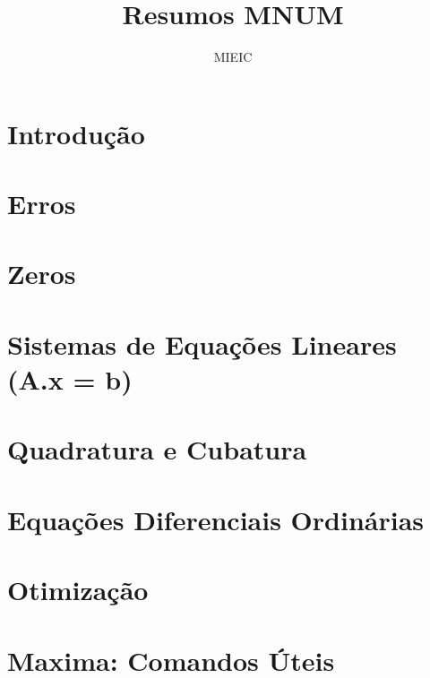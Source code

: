 \documentclass{article}
\title{Resumos MNUM}
\author{MIEIC}
\begin{document}
  
\maketitle

\tableofcontents

\section{Introdução}



\section{Erros}



\section{Zeros}



\section{Sistemas de Equações Lineares (A.x = b)}
 


\section{Quadratura e Cubatura}
 


\section{Equações Diferenciais Ordinárias}
 


\section{Otimização}
 


\section{Maxima: Comandos Úteis}
 

\end{document}
